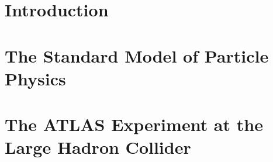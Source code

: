 \documentclass[PhD, UKenglish]{scrbook}
\begin{document}
\makethesistitle

\pagestyle{scrplain}

% 

\tableofcontents

\mainmatter
\pagestyle{scrheadings}





\chapter{Introduction}%
\label{sec:intro}



\chapter{The Standard Model of Particle Physics}%
\label{sec:standard_model}








% 
% 
% 

\chapter{The ATLAS Experiment at the Large Hadron Collider}%
\label{sec:atlas_and_lhc}



\end{document}
